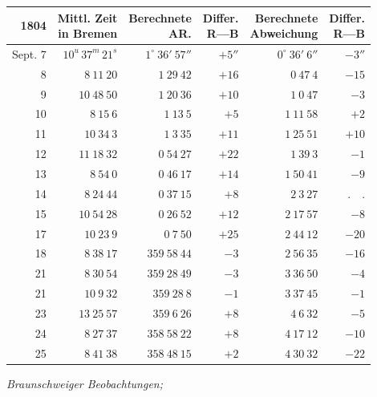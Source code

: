 \begin{center}
\begingroup\fontsize{8}{10}\selectfont\setlength{\tabcolsep}{3pt}\renewcommand{\arraystretch}{1.12}
\begin{tabular}{r|r|r|r|r|r}
1804 & \shortstack{Mittl. Zeit\\in Bremen} & \shortstack{Berechnete\\AR.} & \shortstack{Differ.\\R—B} & \shortstack{Berechnete\\Abweichung} & \shortstack{Differ.\\R—B} \\ \hline
Sept. 7 & $10^{u}\,37^{m}\,21^{s}$ & $1^\circ\ 36'\ 57''$ & $+5''$ & $0^\circ\ 36'\ 6''$ & $-3''$ \\
8 & $8\ 11\ 20$ & $1\ 29\ 42$ & $+16$ & $0\ 47\ 4$ & $-15$ \\
9 & $10\ 48\ 50$ & $1\ 20\ 36$ & $+10$ & $1\ 0\ 47$ & $-3$ \\
10 & $8\ 15\ 6$ & $1\ 13\ 5$ & $+5$ & $1\ 11\ 58$ & $+2$ \\
11 & $10\ 34\ 3$ & $1\ 3\ 35$ & $+11$ & $1\ 25\ 51$ & $+10$ \\
12 & $11\ 18\ 32$ & $0\ 54\ 27$ & $+22$ & $1\ 39\ 3$ & $-1$ \\
13 & $8\ 54\ 0$ & $0\ 46\ 17$ & $+14$ & $1\ 50\ 41$ & $-9$ \\
14 & $8\ 24\ 44$ & $0\ 37\ 15$ & $+8$ & $2\ 3\ 27$ & $ .\quad . $ \\
15 & $10\ 54\ 28$ & $0\ 26\ 52$ & $+12$ & $2\ 17\ 57$ & $-8$ \\
17 & $10\ 23\ 9$ & $0\ 7\ 50$ & $+25$ & $2\ 44\ 12$ & $-20$ \\
18 & $8\ 38\ 17$ & $359\ 58\ 44$ & $-3$ & $2\ 56\ 35$ & $-16$ \\
21 & $8\ 30\ 54$ & $359\ 28\ 49$ & $-3$ & $3\ 36\ 50$ & $-4$ \\
21 & $10\ 9\ 32$ & $359\ 28\ 8$ & $-1$ & $3\ 37\ 45$ & $-1$ \\
23 & $13\ 25\ 57$ & $359\ 6\ 26$ & $+8$ & $4\ 6\ 32$ & $-5$ \\
24 & $8\ 27\ 37$ & $358\ 58\ 22$ & $+8$ & $4\ 17\ 12$ & $-10$ \\
25 & $8\ 41\ 38$ & $358\ 48\ 15$ & $+2$ & $4\ 30\ 32$ & $-22$ \\
\end{tabular}\endgroup
\end{center}

\begin{center}
\textit{Braunschweiger Beobachtungen;} 
\end{center}

